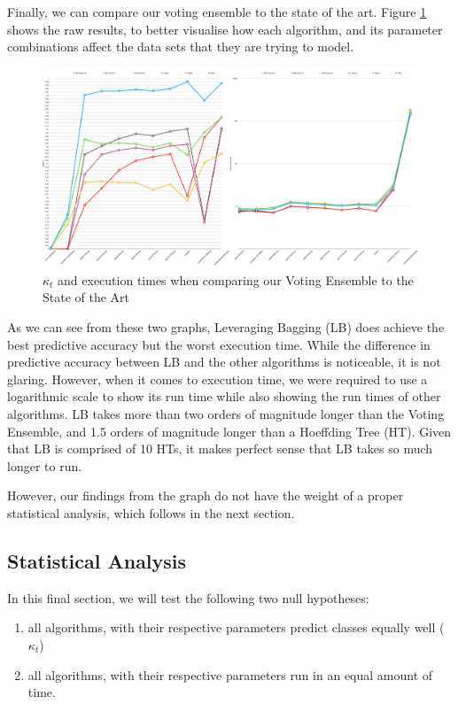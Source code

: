 Finally, we can compare our voting ensemble to the state of the art. Figure \ref{fig:raw_compare_sota_all} shows the raw results, to better visualise how each algorithm, and its parameter combinations affect the data sets that they are trying to model.

\begin{figure}
  \includegraphics[width=\linewidth]{./images/chapter5/compare_sota_all}
\caption{\label{fig:raw_compare_sota_all}$\kappa_t$ and execution times when comparing our Voting Ensemble to the State of the Art}
\end{figure}

As we can see from these two graphs, Leveraging Bagging (LB) does achieve the best predictive accuracy but the worst execution time. While the difference in predictive accuracy between LB and the other algorithms is noticeable, it is not glaring. However, when it comes to execution time, we were required to use a logarithmic scale to show its run time while also showing the run times of other algorithms. LB takes more than two orders of magnitude longer than the Voting Ensemble, and 1.5 orders of magnitude longer than a Hoeffding Tree (HT). Given that LB is comprised of 10 HTs, it makes perfect sense that LB takes so much longer to run.

However, our findings from the graph do not have the weight of a proper statistical analysis, which follows in the next section.

\subsection{Statistical Analysis}
In this final section, we will test the following two null hypotheses:
\begin{enumerate}
\item all algorithms, with their respective parameters predict classes equally well ($\kappa_t$)
\item all algorithms, with their respective parameters run in an equal amount of time.
\end{enumerate}

